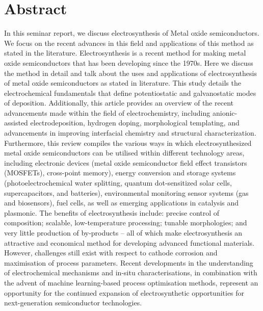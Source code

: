 \documentclass[12pt,a4paper]{report}
\begin{document}
	
	\tableofcontents
	\newpage
	\listoffigures
	\newpage
	
	

	
	\chapter*{Abstract}
	In this seminar report, we discuss electrosynthesis of Metal oxide semiconductors. We focus on the recent advances in this field and applications of this method as stated in the literature. Electrosynthesis is a recent method for making metal oxide semiconductors that has been developing since the 1970s. Here we discuss the method in detail and talk about the uses and applications of electrosynthesis of metal oxide semiconductors as stated in literature. This study details the electrochemical fundamentals that define potentiostatic and galvanostatic modes of deposition. Additionally, this article provides an overview of the recent advancements made within the field of electrochemistry, including anionic-assisted electrodeposition, hydrogen doping, morphological templating, and advancements in improving interfacial chemistry and structural characterization. Furthermore, this review compiles the various ways in which electrosynthesized metal oxide semiconductors can be utilised within different technology areas, including electronic devices (metal oxide semiconductor field effect transistors (MOSFETs), cross-point memory), energy conversion and storage systems (photoelectrochemical water splitting, quantum dot-sensitized solar cells, supercapacitors, and batteries), environmental monitoring sensor systems (gas and biosensors), fuel cells, as well as emerging applications in catalysis and plasmonic. The benefits of electrosynthesis include: precise control of composition; scalable, low-temperature processing; tunable morphologies; and very little production of by-products – all of which make electrosynthesis an attractive and economical method for developing advanced functional materials. However, challenges still exist with respect to cathode corrosion and maximisation of process parameters. Recent developments in the understanding of electrochemical mechanisms and in-situ characterisations, in combination with the advent of machine learning-based process optimisation methods, represent an opportunity for the continued expansion of electrosynthetic opportunities for next-generation semiconductor technologies.
	
\end{document}
